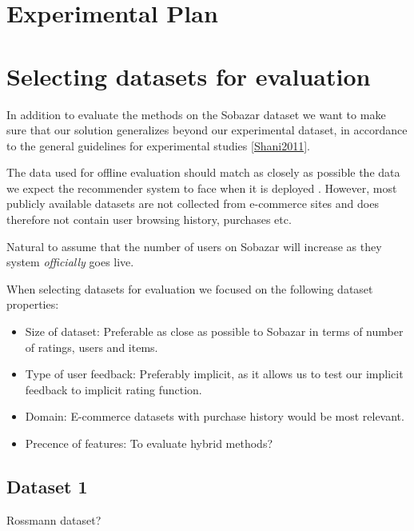 \section{Experimental Plan}



\section{Selecting datasets for evaluation}

In addition to evaluate the methods on the Sobazar dataset we want to make sure that our solution generalizes beyond our experimental dataset, in accordance to the general guidelines for experimental studies \ref{Shani2011}.

The data used for offline evaluation should match as closely as possible the data we expect the recommender system to face when it is deployed \cite{Gunawardana2009}. However, most publicly available datasets are not collected from e-commerce sites and does therefore not contain user browsing history, purchases etc. 


Natural to assume that the number of users on Sobazar will increase as they system \emph{officially} goes live.





When selecting datasets for evaluation we focused on the following dataset properties:


\begin{itemize}
\item Size of dataset: Preferable as close as possible to Sobazar in terms of number of ratings, users and items.
\item Type of user feedback: Preferably implicit, as it allows us to test our implicit feedback to implicit rating function.
\item Domain: E-commerce datasets with purchase history would be most relevant.
\item Precence of features: To evaluate hybrid methods?
\end{itemize}



\subsection{Dataset 1}

Rossmann dataset?

